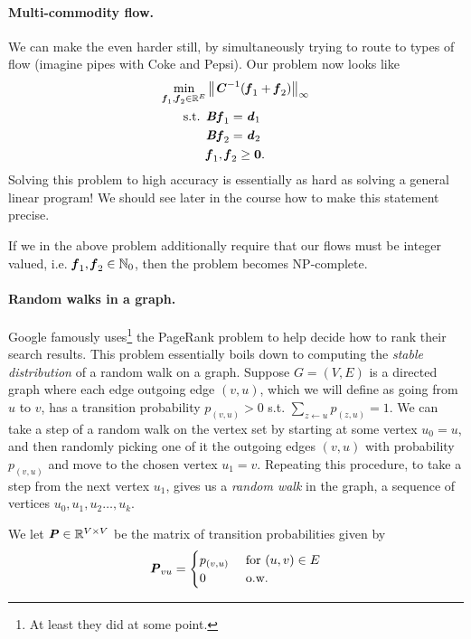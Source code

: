 \paragraph{Multi-commodity flow.}
We can make the even harder still, by simultaneously trying to route
to types of flow (imagine pipes with Coke and Pepsi).
Our problem now looks like
\begin{align*}
\min_{\boldsymbol{\mathit{f}}_1, \boldsymbol{\mathit{f}}_2 \in \mathbb{R}^E } & \left\| \boldsymbol{\mathit{C}}^{-1} (\boldsymbol{\mathit{f}}_1 + \boldsymbol{\mathit{f}}_2) \right\|_{\infty} \\
  \textrm{s.t. } &  \boldsymbol{\mathit{B}} \boldsymbol{\mathit{f}}_1 = \boldsymbol{\mathit{d}}_1 \\
                              & \boldsymbol{\mathit{B}} \boldsymbol{\mathit{f}}_2 = \boldsymbol{\mathit{d}}_2\\
                     &  \boldsymbol{\mathit{f}}_1, \boldsymbol{\mathit{f}}_2 \geq \boldsymbol{0}.
\end{align*}
Solving this problem to high accuracy is essentially as hard as
solving a general linear program! We should see later in the course
how to make this statement precise.

If we in the above problem additionally require that our flows must be
integer valued, i.e. $\boldsymbol{\mathit{f}}_1, \boldsymbol{\mathit{f}}_2 \in \mathbb{N}_{0}$, then the problem becomes NP-complete.

\paragraph{Random walks in a graph.}
Google famously uses\footnote{At least they did at some point.} the
PageRank problem to help decide how to rank their search results.
This problem essentially boils down to computing the \emph{stable
distribution} of a random walk on a graph.
Suppose $G=(V,E)$ is a directed graph where each edge outgoing edge
$(v,u)$, which we will define as going from $u$ to $v$, has a
transition probability $p_{(v,u)} > 0$ s.t. $\sum_{z \leftarrow u}
p_{(z,u)} = 1$.
We can take a step of a random walk on the vertex set by starting at some vertex
$u_0 = u$, and then randomly picking one of it the outgoing edges
$(v,u)$ with probability $p_{(v,u)}$  and move to
the chosen vertex $u_1 = v$.  Repeating this procedure, to take a step from
the next vertex $u_1$, gives us a
\emph{random walk} in the graph, a sequence of vertices $u_0, u_1, u_2
\ldots, u_k$.

We let $\boldsymbol{\mathit{P}} \in \mathbb{R}^{V \times V}$ be the matrix of transition
probabilities given by
\[
  \boldsymbol{\mathit{P}}_{vu} =
  \begin{cases}
    p_{(v,u)} & \text{ for } (u,v) \in E \\
    0 & \text{ o.w.}
  \end{cases}
\]

